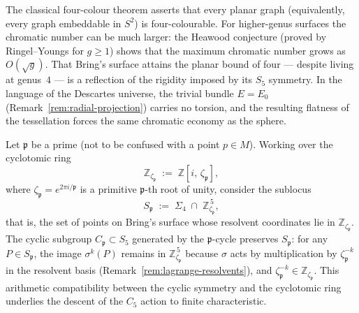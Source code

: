 \begin{remark}
\label{rem:four-colour-theorem}
The classical four-colour theorem asserts that every planar graph (equivalently,
every graph embeddable in $S^2$) is four-colourable.  For higher-genus
surfaces the chromatic number can be much larger: the Heawood conjecture
(proved by Ringel--Youngs for $g\geq 1$) shows that the maximum chromatic
number grows as $O(\sqrt{g})$.  That Bring's surface attains the planar
bound of four --- despite living at genus~$4$ --- is a reflection of the
rigidity imposed by its $S_5$ symmetry.  In the language of the Descartes
universe, the trivial bundle $E=E_0$
(Remark~\ref{rem:radial-projection}) carries no torsion, and the resulting
flatness of the tessellation forces the same chromatic economy as the
sphere.
\end{remark}

\begin{remark}
\label{rem:cyclotomic-reduction}
Let $\mathfrak{p}$ be a prime (not to be confused with a point $p\in M$).
Working over the cyclotomic ring
\begin{equation}\label{eq:cyclotomic-ring}
  \mathbb{Z}_{\zeta_{\mathfrak{p}}}
  \;:=\;\mathbb{Z}[i,\,\zeta_{\mathfrak{p}}],
\end{equation}
where $\zeta_{\mathfrak{p}}=e^{2\pi i/\mathfrak{p}}$ is a primitive
$\mathfrak{p}$-th root of unity, consider the sublocus
\[
  S_{\mathfrak{p}}
  \;:=\;
  \Sigma_4\;\cap\;\mathbb{Z}_{\zeta_{\mathfrak{p}}}^{\,5},
\]
that is, the set of points on Bring's surface whose resolvent coordinates
lie in $\mathbb{Z}_{\zeta_{\mathfrak{p}}}$.  The cyclic subgroup
$C_{\mathfrak{p}}\subset S_5$ generated by the $\mathfrak{p}$-cycle preserves
$S_{\mathfrak{p}}$: for any $P\in S_{\mathfrak{p}}$, the image
$\sigma^k(P)$ remains in $\mathbb{Z}_{\zeta_{\mathfrak{p}}}^{\,5}$ because
$\sigma$ acts by multiplication by $\zeta_{\mathfrak{p}}^{-k}$ in the
resolvent basis (Remark~\ref{rem:lagrange-resolvents}), and
$\zeta_{\mathfrak{p}}^{-k}\in\mathbb{Z}_{\zeta_{\mathfrak{p}}}$.  This
arithmetic compatibility between the cyclic symmetry and the cyclotomic ring
underlies the descent of the $C_5$ action to finite characteristic.
\end{remark}

